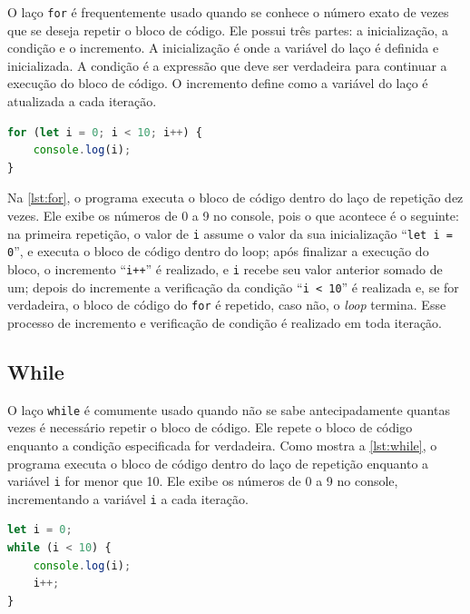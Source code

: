 O laço \texttt{for} é frequentemente usado quando se conhece o número exato de vezes que se deseja repetir o bloco de código. Ele possui três partes: a inicialização, a condição e o incremento. A inicialização é onde a variável do laço é definida e inicializada. A condição é a expressão que deve ser verdadeira para continuar a execução do bloco de código. O incremento define como a variável do laço é atualizada a cada iteração.

\begin{lstlisting}[language=TypeScript, caption=Exemplo do laço de repetição \texttt{for} em JS e TS., label=lst:for]
for (let i = 0; i < 10; i++) {
    console.log(i);
}
\end{lstlisting}

Na \autoref{lst:for}, o programa executa o bloco de código dentro do laço de repetição dez vezes. Ele exibe os números de 0 a 9 no console, pois o que acontece é o seguinte: na primeira repetição, o valor de \texttt{i} assume o valor da sua inicialização ``\texttt{let i = 0}'', e executa o bloco de código dentro do loop; após finalizar a execução do bloco, o incremento ``\texttt{i++}'' é realizado, e \texttt{i} recebe seu valor anterior somado de um; depois do incremente a verificação da condição ``\texttt{i < 10}'' é realizada e, se for verdadeira, o bloco de código do \texttt{for} é repetido, caso não, o \textit{loop} termina. Esse processo de incremento e verificação de condição é realizado em toda iteração.


\subsection{While}

O laço \texttt{while} é comumente usado quando não se sabe antecipadamente quantas vezes é necessário repetir o bloco de código. Ele repete o bloco de código enquanto a condição especificada for verdadeira. Como mostra a \autoref{lst:while}, o programa executa o bloco de código dentro do laço de repetição enquanto a variável \texttt{i} for menor que 10. Ele exibe os números de 0 a 9 no console, incrementando a variável \texttt{i} a cada iteração.

\Needspace{0.3\textheight}
\begin{lstlisting}[language=TypeScript, caption=Exemplo do laço de repetição \texttt{while} em JS e TS., label=lst:while]
let i = 0;
while (i < 10) {
    console.log(i);
    i++;
}
\end{lstlisting}

